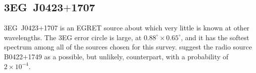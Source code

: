 \subsection{3EG~J0423$+$1707}

3EG~J0423$+$1707 is an EGRET source about which very little is known at
other wavelengths. The 3EG error circle is large, at
$0.88^\circ\times0.65^\circ$, and it has the softest spectrum among
all of the sources chosen for this
survey. \citet{REF::MATTOX::APJS2001} suggest the radio source
B0422$+$1749 as a possible, but unlikely, counterpart, with a
probability of $2\times10^{-4}$.

\begin{figure}[t]

\end{figure}
